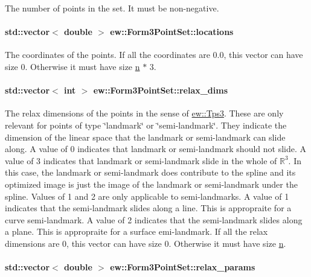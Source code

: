The number of points in the set. It must be non-\/negative. \hypertarget{classew_1_1Form3PointSet_a809a22134ac1c040f41aaeee77478d34}{
\paragraph[{locations}]{\setlength{\rightskip}{0pt plus 5cm}std::vector$<$ double $>$ {\bf ew::Form3PointSet::locations}}\hfill}
\label{classew_1_1Form3PointSet_a809a22134ac1c040f41aaeee77478d34}
The coordinates of the points. If all the coordinates are 0.0, this vector can have size 0. Otherwise it must have size \hyperlink{classew_1_1Form3PointSet_a5bebf378e3fa2c68be2c002e216e9302}{n} $\ast$ 3. \hypertarget{classew_1_1Form3PointSet_adc4dcbefde6d9c035548e5fe2ebe1ec7}{
\paragraph[{relax\_\-dims}]{\setlength{\rightskip}{0pt plus 5cm}std::vector$<$ int $>$ {\bf ew::Form3PointSet::relax\_\-dims}}\hfill}
\label{classew_1_1Form3PointSet_adc4dcbefde6d9c035548e5fe2ebe1ec7}
The relax dimensions of the points in the sense of \hyperlink{classew_1_1Tps3}{ew::Tps3}. These are only relevant for points of type \char`\"{}landmark\char`\"{} or \char`\"{}semi-\/landmark\char`\"{}. They indicate the dimension of the linear space that the landmark or semi-\/landmark can slide along. A value of 0 indicates that landmark or semi-\/landmark should not slide. A value of 3 indicates that landmark or semi-\/landmark slide in the whole of $\mathbb{R}^3$. In this case, the landmark or semi-\/landmark does contribute to the spline and its optimized image is just the image of the landmark or semi-\/landmark under the spline. Values of 1 and 2 are only applicable to semi-\/landmarks. A value of 1 indicates that the semi-\/landmark slides along a line. This is appropraite for a curve semi-\/landmark. A value of 2 indicates that the semi-\/landmark slides along a plane. This is appropraite for a surface emi-\/landmark. If all the relax dimensions are 0, this vector can have size 0. Otherwise it must have size \hyperlink{classew_1_1Form3PointSet_a5bebf378e3fa2c68be2c002e216e9302}{n}. \hypertarget{classew_1_1Form3PointSet_afd8ff3e67234c11b1ad3c66f1cccfb67}{
\paragraph[{relax\_\-params}]{\setlength{\rightskip}{0pt plus 5cm}std::vector$<$ double $>$ {\bf ew::Form3PointSet::relax\_\-params}}\hfill}
